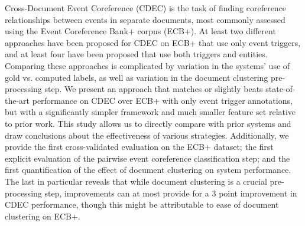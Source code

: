 Cross-Document Event Coreference (CDEC) is the task of finding coreference relationships between events in separate documents, most commonly assessed using the Event Coreference Bank+ corpus (ECB+). At least two different approaches have been proposed for CDEC on ECB+ that use only event triggers, and at least four have been proposed that use both triggers and entities. Comparing these approaches is complicated by variation in the systems' use of gold vs. computed labels, as well as variation in the document clustering pre-processing step. We present an approach that matches or slightly beats state-of-the-art performance on CDEC over ECB+ with only event trigger annotations, but with a significantly simpler framework and much smaller feature set relative to prior work. This study allows us to directly compare with prior systems and draw conclusions about the effectiveness of various strategies. Additionally, we provide the first cross-validated evaluation on the ECB+ dataset; the first explicit evaluation of the pairwise event coreference classification step; and the first quantification of the effect of document clustering on system performance. The last in particular reveals that while document clustering is a crucial pre-processing step, improvements can at most provide for a 3 point improvement in CDEC performance, though this might be attributable to ease of document clustering on ECB+.

